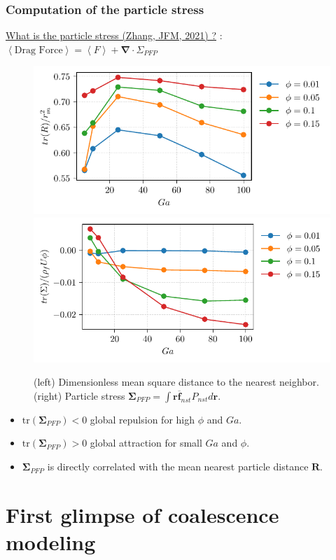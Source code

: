\documentclass{sintefbeamer}
\newcommand{\avg}[1]{\left<#1\right>}
\newcommand{\nstavg}[1]{\overline{#1}_{nst}}
\newcommand{\nablab}{\bm{\nabla}}
\begin{document}
\begin{frame}
  \frametitle{Computation of the particle stress}
  \underline{What is the particle stress (Zhang, JFM, 2021) ?}  
   : $\avg{\text{Drag Force}} = \avg{F} + \nablab \cdot \Sigma_{PFP}$
  \begin{figure}
    \includegraphics[height=0.25\textwidth]{image/HOMOGENEOUS/fPA/RR.pdf}
    \includegraphics[height=0.25\textwidth]{image/HOMOGENEOUS/fPA/PFP.pdf}
    \caption{ 
      (left) Dimensionless  mean square distance to the nearest neighbor. 
      (right) Particle stress $\mathbf{\Sigma}_{PFP} = \int \textbf{r}\nstavg{\textbf{f}} P_{nst}d\textbf{r}$.
      }
  \end{figure}
  
\begin{itemize}
  \item $\text{tr}(\mathbf{\Sigma}_{PFP}) < 0$ global repulsion for high $\phi$ and $Ga$. 
  \item $\text{tr}(\mathbf{\Sigma}_{PFP}) > 0$ global attraction for small $Ga$ and $\phi$.
  \item  $\mathbf{\Sigma}_{PFP}$ is directly correlated with the mean nearest particle distance $\textbf{R}$. 
\end{itemize}

\end{frame}


\section{First glimpse of coalescence modeling}
\section*{}
\end{document}
